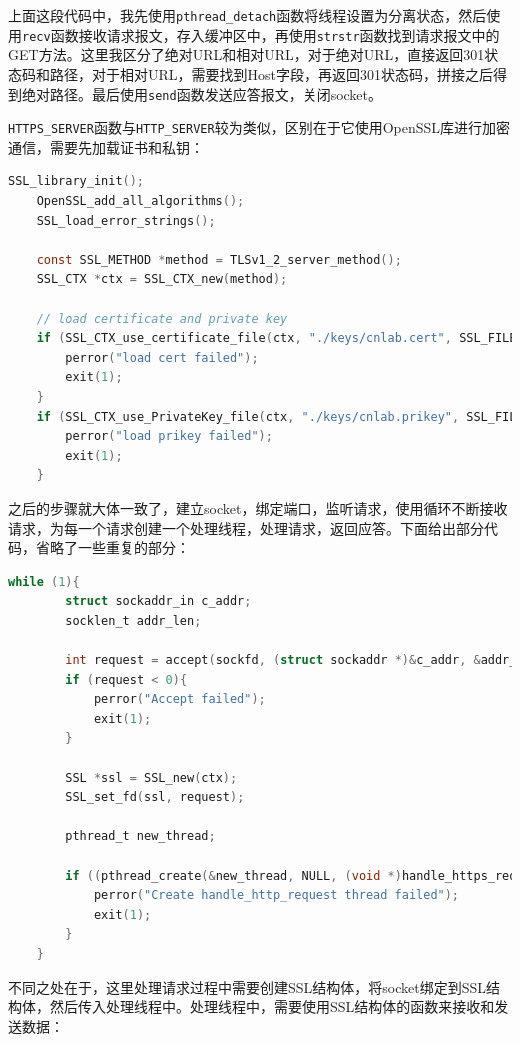 \documentclass[UTF8]{article}
\begin{document}
上面这段代码中，我先使用\texttt{pthread\_detach}函数将线程设置为分离状态，然后使用\texttt{recv}函数接收请求报文，存入缓冲区中，再使用\texttt{strstr}函数找到请求报文中的GET方法。这里我区分了绝对URL和相对URL，对于绝对URL，直接返回301状态码和路径，对于相对URL，需要找到Host字段，再返回301状态码，拼接之后得到绝对路径。最后使用\texttt{send}函数发送应答报文，关闭socket。

\texttt{HTTPS\_SERVER}函数与\texttt{HTTP\_SERVER}较为类似，区别在于它使用OpenSSL库进行加密通信，需要先加载证书和私钥：

\begin{lstlisting}[language=c]
    SSL_library_init();
    OpenSSL_add_all_algorithms();
    SSL_load_error_strings();

    const SSL_METHOD *method = TLSv1_2_server_method();
    SSL_CTX *ctx = SSL_CTX_new(method);

    // load certificate and private key
    if (SSL_CTX_use_certificate_file(ctx, "./keys/cnlab.cert", SSL_FILETYPE_PEM) <= 0){
        perror("load cert failed");
        exit(1);
    }
    if (SSL_CTX_use_PrivateKey_file(ctx, "./keys/cnlab.prikey", SSL_FILETYPE_PEM) <= 0){
        perror("load prikey failed");
        exit(1);
    }
\end{lstlisting}

之后的步骤就大体一致了，建立socket，绑定端口，监听请求，使用循环不断接收请求，为每一个请求创建一个处理线程，处理请求，返回应答。下面给出部分代码，省略了一些重复的部分：

\begin{lstlisting}[language=c]
    while (1){
        struct sockaddr_in c_addr;
        socklen_t addr_len;

        int request = accept(sockfd, (struct sockaddr *)&c_addr, &addr_len);
        if (request < 0){
            perror("Accept failed");
            exit(1);
        }

        SSL *ssl = SSL_new(ctx);
        SSL_set_fd(ssl, request);

        pthread_t new_thread;

        if ((pthread_create(&new_thread, NULL, (void *)handle_https_request, (void *)ssl)) != 0){
            perror("Create handle_http_request thread failed");
            exit(1);
        }
    }
\end{lstlisting}

不同之处在于，这里处理请求过程中需要创建SSL结构体，将socket绑定到SSL结构体，然后传入处理线程中。处理线程中，需要使用SSL结构体的函数来接收和发送数据：
\end{document}

